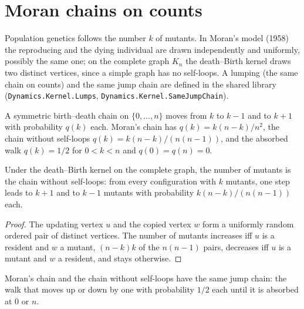\section{Moran chains on counts}\label{sec:moran-counts}
Population genetics follows the number $k$ of mutants. In Moran's model (1958) the reproducing
and the dying individual are drawn independently and uniformly, possibly the same one; on the
complete graph $K_n$ the death--Birth kernel draws two distinct vertices, since a simple graph has
no self-loops. A lumping (the same chain on counts) and the same jump chain are defined in the
shared library (\texttt{Dynamics.Kernel.Lumps}, \texttt{Dynamics.Kernel.SameJumpChain}).
\begin{definition}\label{def:moran-counts}
\leanok
A symmetric birth--death chain on $\{0,\dots,n\}$ moves from $k$ to $k-1$ and to $k+1$ with
probability $q(k)$ each. Moran's chain has $q(k)=k(n-k)/n^2$, the chain without self-loops
$q(k)=k(n-k)/(n(n-1))$, and the absorbed walk $q(k)=1/2$ for $0<k<n$ and $q(0)=q(n)=0$.
\end{definition}
\begin{theorem}\label{thm:pull-lumps}
\leanok{}
Under the death--Birth kernel on the complete graph, the number of mutants is the chain without
self-loops: from every configuration with $k$ mutants, one step leads to $k+1$ and to $k-1$
mutants with probability $k(n-k)/(n(n-1))$ each.
\end{theorem}
\begin{proof}\leanok
The updating vertex $u$ and the copied vertex $w$ form a uniformly random ordered pair of
distinct vertices. The number of mutants increases iff $u$ is a resident and $w$ a mutant,
$(n-k)k$ of the $n(n-1)$ pairs, decreases iff $u$ is a mutant and $w$ a resident, and stays
otherwise.
\end{proof}
\begin{theorem}\label{thm:moran-jump}
\leanok{}
Moran's chain and the chain without self-loops have the same jump chain: the walk that moves up or
down by one with probability $1/2$ each until it is absorbed at $0$ or $n$.
\end{theorem}
